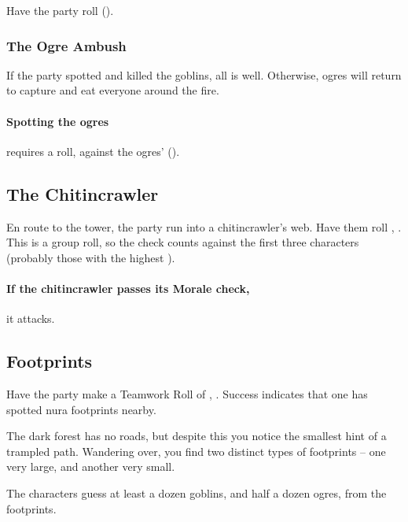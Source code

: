 \begin{multicols}{2}
Have the party roll  (\tn[10]).

\subsubsection{The Ogre Ambush}

If the party spotted and killed the goblins, all is well.
Otherwise, ogres will return to capture and eat everyone around the fire.

\ogre

\paragraph{Spotting the ogres}
requires a  roll, against the ogres'  (\tn).

\subsection{The Chitincrawler}

En route to the tower, the party run into a chitincrawler's web.
Have them roll , \tn[10].
This is a group roll, so the check counts against the first three characters (probably those with the highest ).

\chitincrawler

\paragraph{If the chitincrawler passes its Morale check,}
it attacks.%

\subsection{Footprints}

Have the party make a Teamwork Roll of , \tn[10].
Success indicates that one has spotted nura footprints nearby.

\begin{boxtext}

  The dark forest has no roads, but despite this you notice the smallest hint of a trampled path.
  Wandering over, you find two distinct types of footprints -- one very large, and another very small.

\end{boxtext}

The characters guess at least a dozen goblins, and half a dozen ogres, from the footprints.


\end{multicols}
